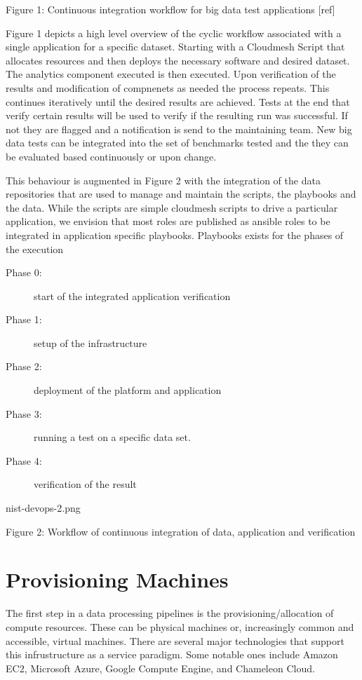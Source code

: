 \documentclass[9pt,twocolumn,twoside]{styles/osajnl}
\begin{document}
Figure 1: Continuous integration workflow for big data test applications [ref]


Figure 1 depicts a high level overview of the cyclic workflow associated with a single application for a specific dataset. Starting with a Cloudmesh Script that allocates resources and then deploys the necessary software and desired dataset. The analytics component executed is then executed. Upon verification of the results and modification of compnenets as needed the process repeats. This continues iteratively until the desired results are achieved. Tests at the end that verify certain results will be used to verify if the resulting run was successful. If not they are flagged and a notification is send to the maintaining team. New big data tests can be integrated into the set of benchmarks tested and the they can be evaluated based continuously or upon change. 


This behaviour is augmented in Figure 2 with the integration of the data repositories that are used to manage and maintain the scripts, the playbooks and the data. While the scripts are simple cloudmesh scripts to drive a particular application, we envision that most roles are published as ansible roles to be integrated in application specific playbooks. Playbooks exists for the  phases of the execution

\begin{description}
\item[Phase 0:] start of the integrated application verification
\item[Phase 1:] setup of the infrastructure 
\item[Phase 2:] deployment of the platform and application
\item[Phase 3:] running a test on a specific data set.
\item[Phase 4:] verification of the result
\end{description}

 nist-devops-2.png 



Figure 2: Workflow of continuous integration of data, application and verification


\section{Provisioning Machines}



The first step in a data processing pipelines is the provisioning/allocation of compute resources. These can be physical machines or, increasingly common and accessible, virtual machines. There are several major technologies that support this infrustructure as a service paradigm. Some notable ones include Amazon EC2, Microsoft Azure, Google Compute Engine, and Chameleon Cloud.
\end{document}
